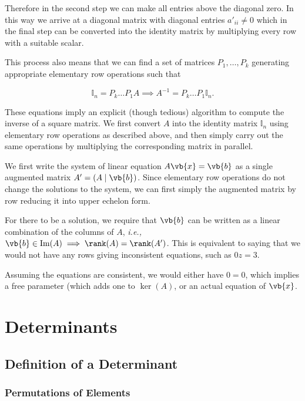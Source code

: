 \documentclass[a4paper,12pt]{report}
\begin{document}
Therefore in the second step we can make all entries above the diagonal zero. In this way we arrive at a diagonal matrix with diagonal entries \(a'_{ii} \neq 0 \) which in the final step can be converted into the identity matrix by multiplying every row with a suitable scalar. 

This process also means that we can find a set of matrices \(P_{1} ,\ldots ,P_{k}\) generating appropriate elementary row operations such that 

\begin{equation}
    \mathbb{I}_{n} = P_{k} \ldots P_{1}A \implies A^{-1} = P_{k} \ldots P_{1} \mathbb{I}_{n}.    
\end{equation}

These equations imply an explicit (though tedious) algorithm to compute the inverse of a square matrix. We first convert \(A\) into the identity matrix \(\mathbb{I}_{n} \) using elementary row operations as described above, and then simply carry out the same operations by multiplying the corresponding matrix in parallel. 

We first write the system of linear equation \(A\vb{x} = \vb{b} \) as a single augmented matrix \(A' = (A \mid \vb{b} )\). Since elementary row operations do not change the solutions to the system, we can first simply the augmented matrix by row reducing it into upper echelon form.

For there to be a solution, we require that \(\vb{b} \) can be written as a linear combination of the columns of \(A\), \textit{i.e.,} \(\vb{b} \in  \text{Im}(A) \implies \rank (A) = \rank (A')\). This is equivalent to saying that we would not have any rows giving inconsistent equations, such as \(0z=3\).

Assuming the equations are consistent, we would either have \(0=0\), which implies a free parameter (which adds one to \(\ker (A)\), or an actual equation of \(\vb{x} \).  

\chapter{Determinants}

\section{Definition of a Determinant}

\subsection{Permutations of Elements}
\end{document}
